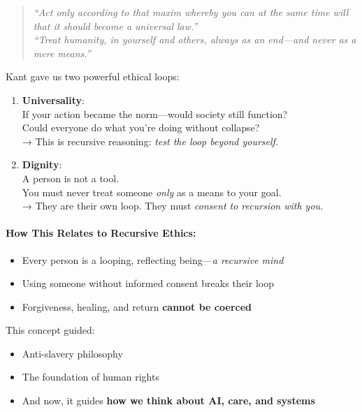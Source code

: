 \begin{quote}
\emph{``Act only according to that maxim whereby you can at the same
time will that it should become a universal law.''\\
} \emph{``Treat humanity, in yourself and others, always as an end---and
never as a mere means.''}
\end{quote}

Kant gave us two powerful ethical loops:

\begin{enumerate}
\def\labelenumi{\arabic{enumi}.}
\item
  \textbf{Universality}:\\
  If your action became the norm---would society still function?\\
  Could everyone do what you're doing without collapse?\\
  → This is recursive reasoning: \emph{test the loop beyond yourself.\\
  }
\item
  \textbf{Dignity}:\\
  A person is not a tool.\\
  You must never treat someone \emph{only} as a means to your goal.\\
  → They are their own loop. They must \emph{consent to recursion with
  you.\\
  }
\end{enumerate}

\paragraph{\texorpdfstring{\textbf{How This Relates to Recursive
Ethics:}}{How This Relates to Recursive Ethics:}}\label{how-this-relates-to-recursive-ethics}

\begin{itemize}
\item
  Every person is a looping, reflecting being---\emph{a recursive mind\\
  }
\item
  Using someone without informed consent breaks their loop
\item
  Forgiveness, healing, and return \textbf{cannot be coerced\\
  }
\end{itemize}

This concept guided:

\begin{itemize}
\item
  Anti-slavery philosophy
\item
  The foundation of human rights
\item
  And now, it guides \textbf{how we think about AI, care, and systems\\
  }
\end{itemize}

